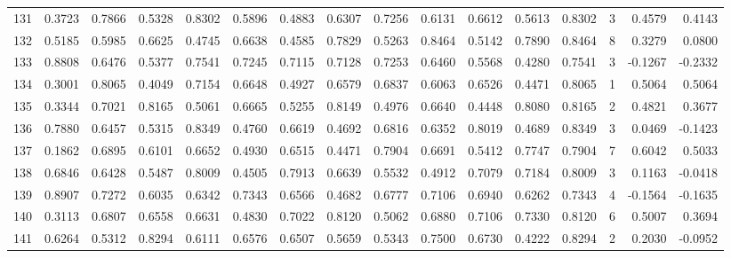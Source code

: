 \begin{tabular}{lrrrrrrrrrrrrrrr}
131 &      0.3723 &  0.7866 &  0.5328 &  0.8302 &  0.5896 &  0.4883 &  0.6307 &  0.7256 &  0.6131 &  0.6612 &   0.5613 &     0.8302 &      3 &                    0.4579 &                     0.4143 \\
132 &      0.5185 &  0.5985 &  0.6625 &  0.4745 &  0.6638 &  0.4585 &  0.7829 &  0.5263 &  0.8464 &  0.5142 &   0.7890 &     0.8464 &      8 &                    0.3279 &                     0.0800 \\
133 &      0.8808 &  0.6476 &  0.5377 &  0.7541 &  0.7245 &  0.7115 &  0.7128 &  0.7253 &  0.6460 &  0.5568 &   0.4280 &     0.7541 &      3 &                   -0.1267 &                    -0.2332 \\
134 &      0.3001 &  0.8065 &  0.4049 &  0.7154 &  0.6648 &  0.4927 &  0.6579 &  0.6837 &  0.6063 &  0.6526 &   0.4471 &     0.8065 &      1 &                    0.5064 &                     0.5064 \\
135 &      0.3344 &  0.7021 &  0.8165 &  0.5061 &  0.6665 &  0.5255 &  0.8149 &  0.4976 &  0.6640 &  0.4448 &   0.8080 &     0.8165 &      2 &                    0.4821 &                     0.3677 \\
136 &      0.7880 &  0.6457 &  0.5315 &  0.8349 &  0.4760 &  0.6619 &  0.4692 &  0.6816 &  0.6352 &  0.8019 &   0.4689 &     0.8349 &      3 &                    0.0469 &                    -0.1423 \\
137 &      0.1862 &  0.6895 &  0.6101 &  0.6652 &  0.4930 &  0.6515 &  0.4471 &  0.7904 &  0.6691 &  0.5412 &   0.7747 &     0.7904 &      7 &                    0.6042 &                     0.5033 \\
138 &      0.6846 &  0.6428 &  0.5487 &  0.8009 &  0.4505 &  0.7913 &  0.6639 &  0.5532 &  0.4912 &  0.7079 &   0.7184 &     0.8009 &      3 &                    0.1163 &                    -0.0418 \\
139 &      0.8907 &  0.7272 &  0.6035 &  0.6342 &  0.7343 &  0.6566 &  0.4682 &  0.6777 &  0.7106 &  0.6940 &   0.6262 &     0.7343 &      4 &                   -0.1564 &                    -0.1635 \\
140 &      0.3113 &  0.6807 &  0.6558 &  0.6631 &  0.4830 &  0.7022 &  0.8120 &  0.5062 &  0.6880 &  0.7106 &   0.7330 &     0.8120 &      6 &                    0.5007 &                     0.3694 \\
141 &      0.6264 &  0.5312 &  0.8294 &  0.6111 &  0.6576 &  0.6507 &  0.5659 &  0.5343 &  0.7500 &  0.6730 &   0.4222 &     0.8294 &      2 &                    0.2030 &                    -0.0952 \\

\end{tabular}
